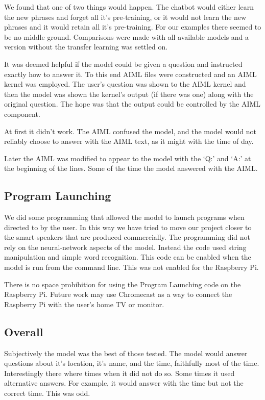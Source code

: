 We found that one of two things would happen. The chatbot would either learn the new phrases and forget all it's pre-training, or it would not learn the new phrases and it would retain all it's pre-training. For our examples there seemed to be no middle ground. Comparisons were made with all available models and a version without the transfer learning was settled on.

It was deemed helpful if the model could be given a question and instructed exactly how to answer it. To this end AIML files were constructed and an AIML kernel was employed. The user's question was shown to the AIML kernel and then the model was shown the kernel's output (if there was one) along with the original question. The hope was that the output could be controlled by the AIML component. 

At first it didn't work. The AIML confused the model, and the model would not reliably choose to answer with the AIML text, as it might with the time of day.

Later the AIML was modified to appear to the model with the `Q:' and `A:' at the beginning of the lines. Some of the time the model answered with the AIML. 

\subsection{Program Launching}

We did some programming that allowed the model to launch programs when directed to by the user. In this way we have tried to move our project closer to the smart-speakers that are produced commercially. The programming did not rely on the neural-network aspects of the model. Instead the code used string manipulation and simple word recognition. This code can be enabled when the model is run from the command line. This was not enabled for the Raspberry Pi.

There is no space prohibition for using the Program Launching code on the Raspberry Pi. Future work may use Chromecast as a way to connect the Raspberry Pi with the user's home TV or monitor. 

\subsection{Overall}

Subjectively the model was the best of those tested. The model would answer questions about it's location, it's name, and the time, faithfully most of the time. Interestingly there where times when it did not do so. Some times it used alternative answers. For example, it would answer with the time but not the correct time. This was odd.

